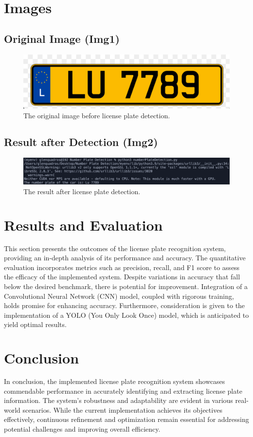 \documentclass[conference]{IEEEtran}
\begin{document}
\section{Images}
\subsection{Original Image (Img1)}
\begin{figure}[h]
  \centering
  \includegraphics[width=0.6\linewidth]{img1.png}
  \caption{The original image before license plate detection.}
  \label{fig:original_image}
\end{figure}

\subsection{Result after Detection (Img2)}
\begin{figure}[h]
  \centering
  \includegraphics[width=0.6\linewidth]{img2.png}
  \caption{The result after license plate detection.}
  \label{fig:result_after_detection}
\end{figure}

\section{Results and Evaluation}
This section presents the outcomes of the license plate recognition system, providing an in-depth analysis of its performance and accuracy. The quantitative evaluation incorporates metrics such as precision, recall, and F1 score to assess the efficacy of the implemented system. Despite variations in accuracy that fall below the desired benchmark, there is potential for improvement. Integration of a Convolutional Neural Network (CNN) model, coupled with rigorous training, holds promise for enhancing accuracy. Furthermore, consideration is given to the implementation of a YOLO (You Only Look Once) model, which is anticipated to yield optimal results.

\section{Conclusion}
In conclusion, the implemented license plate recognition system showcases commendable performance in accurately identifying and extracting license plate information. The system's robustness and adaptability are evident in various real-world scenarios. While the current implementation achieves its objectives effectively, continuous refinement and optimization remain essential for addressing potential challenges and improving overall efficiency.
\end{document}
